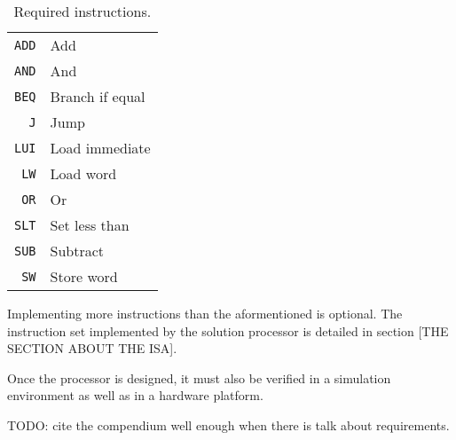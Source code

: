 \begin{table}
    \begin{center}
        \begin{tabular}{r|l}
            \texttt{ADD} & Add \\
            \texttt{AND} & And \\
            \texttt{BEQ} & Branch if equal \\
            \texttt{J} & Jump \\
            \texttt{LUI} & Load immediate \\
            \texttt{LW} & Load word \\
            \texttt{OR} & Or \\
            \texttt{SLT} & Set less than \\
            \texttt{SUB} & Subtract \\
            \texttt{SW} & Store word \\
            \hline
        \end{tabular}
        \smallskip
        \smallskip
        \caption{Required instructions.}
        \label{table:required-instructions}
    \end{center}
\end{table}

Implementing more instructions than the aformentioned is optional.
The instruction set implemented by the solution processor is detailed in section [THE SECTION ABOUT THE ISA].

Once the processor is designed, it must also be verified in a simulation environment as well as in a hardware platform.

TODO: cite the compendium well enough when there is talk about requirements.
